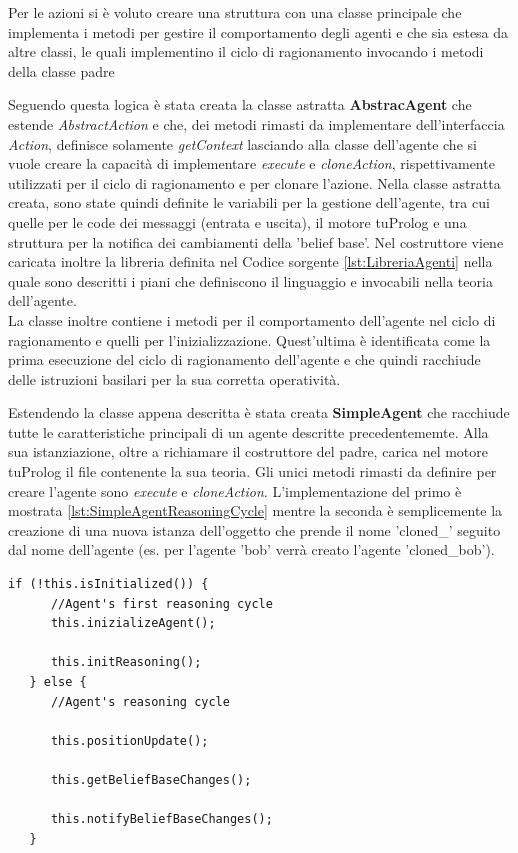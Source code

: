 \documentclass[12pt,a4paper,openright,twoside]{report}
\begin{document}
Per le azioni si \`e voluto creare una struttura con una classe principale che implementa i metodi per gestire il comportamento degli agenti e che sia estesa da altre classi, le quali implementino il ciclo di ragionamento invocando i metodi della classe padre

Seguendo questa logica \`e stata creata la classe astratta \textbf{AbstracAgent} che estende \textit{AbstractAction} e che, dei metodi rimasti da implementare dell'interfaccia \textit{Action}, definisce solamente \textit{getContext} lasciando alla classe dell'agente che si vuole creare la capacit\`a di implementare \textit{execute} e \textit{cloneAction}, rispettivamente utilizzati per il ciclo di ragionamento e per clonare l'azione.
Nella classe astratta creata, sono state quindi definite le variabili per la gestione dell'agente, tra cui quelle per le code dei messaggi (entrata e uscita), il motore tuProlog e una struttura per la notifica dei cambiamenti della 'belief base'. Nel costruttore viene caricata inoltre la libreria definita nel Codice sorgente \ref{lst:LibreriaAgenti} nella quale sono descritti i piani che definiscono il linguaggio e invocabili nella teoria dell'agente.
\\
La classe inoltre contiene i metodi per il comportamento dell'agente nel ciclo di ragionamento e quelli per l'inizializzazione. Quest'ultima \`e identificata come la prima esecuzione del ciclo di ragionamento dell'agente e che quindi racchiude delle istruzioni basilari per la sua corretta operativit\`a.

Estendendo la classe appena descritta \`e stata creata \textbf{SimpleAgent} che racchiude tutte le caratteristiche principali di un agente descritte precedentememte. Alla sua istanziazione, oltre a richiamare il costruttore del padre, carica nel motore tuProlog il file contenente la sua teoria. Gli unici metodi rimasti da definire per creare l'agente sono \textit{execute} e \textit{cloneAction}.
L'implementazione del primo \`e mostrata \ref{lst:SimpleAgentReasoningCycle} mentre la seconda \`e semplicemente la creazione di una nuova istanza dell'oggetto che prende il nome 'cloned\_' seguito dal nome dell'agente (es. per l'agente 'bob' verr\`a creato l'agente 'cloned\_bob').

\medskip
\begin{lstlisting}[firstnumber=1,label={lst:SimpleAgentReasoningCycle},caption={Simple Agent Reasoning Cycle}]
   if (!this.isInitialized()) {
      //Agent's first reasoning cycle
      this.inizializeAgent();

      this.initReasoning();
   } else {
      //Agent's reasoning cycle

      this.positionUpdate();

      this.getBeliefBaseChanges();

      this.notifyBeliefBaseChanges();
   }
\end{lstlisting}
\end{document}
